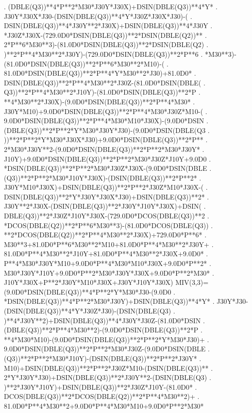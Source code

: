 \begin{framedverbatim}
     . (DBLE(Q3))**4*P**2*M30*J30Y*J30X)+DSIN(DBLE(Q3))**4*Y*
     . J30Y*J30X*J30-(DSIN(DBLE(Q3))**4*Y*J30Z*J30X*J30)-(
     . DSIN(DBLE(Q3))**4*J30Y**2*J30X)+DSIN(DBLE(Q3))**4*J30Y
     . *J30Z*J30X-(729.0D0*DSIN(DBLE(Q3))**2*DSIN(DBLE(Q2))**
     . 2*P**6*M30**3)-(81.0D0*DSIN(DBLE(Q3))**2*DSIN(DBLE(Q2)
     . )**2*P**4*M30**2*J30Y)-(729.0D0*DSIN(DBLE(Q3))**2*P**6
     . *M30**3)-(81.0D0*DSIN(DBLE(Q3))**2*P**6*M30**2*M10)-(
     . 81.0D0*DSIN(DBLE(Q3))**2*P**4*Y*M30**2*J30)+81.0D0*
     . DSIN(DBLE(Q3))**2*P**4*M30**2*J30Z-(81.0D0*DSIN(DBLE(
     . Q3))**2*P**4*M30**2*J10Y)-(81.0D0*DSIN(DBLE(Q3))**2*P
     . **4*M30**2*J30X)-(9.0D0*DSIN(DBLE(Q3))**2*P**4*M30*
     . J30Y*M10)+9.0D0*DSIN(DBLE(Q3))**2*P**4*M30*J30Z*M10-(
     . 9.0D0*DSIN(DBLE(Q3))**2*P**4*M30*M10*J30X)-(9.0D0*DSIN
     . (DBLE(Q3))**2*P**2*Y*M30*J30Y*J30)-(9.0D0*DSIN(DBLE(Q3
     . ))**2*P**2*Y*M30*J30X*J30)+9.0D0*DSIN(DBLE(Q3))**2*P**
     . 2*M30*J30Y**2-(9.0D0*DSIN(DBLE(Q3))**2*P**2*M30*J30Y*
     . J10Y)+9.0D0*DSIN(DBLE(Q3))**2*P**2*M30*J30Z*J10Y+9.0D0
     . *DSIN(DBLE(Q3))**2*P**2*M30*J30Z*J30X-(9.0D0*DSIN(DBLE
     . (Q3))**2*P**2*M30*J10Y*J30X)-(DSIN(DBLE(Q3))**2*P**2*
     . J30Y*M10*J30X)+DSIN(DBLE(Q3))**2*P**2*J30Z*M10*J30X-(
     . DSIN(DBLE(Q3))**2*Y*J30Y*J30X*J30)+DSIN(DBLE(Q3))**2*
     . J30Y**2*J30X-(DSIN(DBLE(Q3))**2*J30Y*J10Y*J30X)+DSIN(
     . DBLE(Q3))**2*J30Z*J10Y*J30X-(729.0D0*DCOS(DBLE(Q3))**2
     . *DCOS(DBLE(Q2))**2*P**6*M30**3)-(81.0D0*DCOS(DBLE(Q3))
     . **2*DCOS(DBLE(Q2))**2*P**4*M30**2*J30X)+729.0D0*P**6*
     . M30**3+81.0D0*P**6*M30**2*M10+81.0D0*P**4*M30**2*J30Y+
     . 81.0D0*P**4*M30**2*J10Y+81.0D0*P**4*M30**2*J30X+9.0D0*
     . P**4*M30*J30Y*M10+9.0D0*P**4*M30*M10*J30X+9.0D0*P**2*
     . M30*J30Y*J10Y+9.0D0*P**2*M30*J30Y*J30X+9.0D0*P**2*M30*
     . J10Y*J30X+P**2*J30Y*M10*J30X+J30Y*J10Y*J30X)
      MIV(3,3)=(9.0D0*DSIN(DBLE(Q3))**4*P**2*Y*M30*J30-(9.0D0
     . *DSIN(DBLE(Q3))**4*P**2*M30*J30Y)+DSIN(DBLE(Q3))**4*Y*
     . J30Y*J30-(DSIN(DBLE(Q3))**4*Y*J30Z*J30)-(DSIN(DBLE(Q3)
     . )**4*J30Y**2)+DSIN(DBLE(Q3))**4*J30Y*J30Z-(81.0D0*DSIN
     . (DBLE(Q3))**2*P**4*M30**2)-(9.0D0*DSIN(DBLE(Q3))**2*P
     . **4*M30*M10)-(9.0D0*DSIN(DBLE(Q3))**2*P**2*Y*M30*J30)+
     . 9.0D0*DSIN(DBLE(Q3))**2*P**2*M30*J30Z-(9.0D0*DSIN(DBLE
     . (Q3))**2*P**2*M30*J10Y)-(DSIN(DBLE(Q3))**2*P**2*J30Y*
     . M10)+DSIN(DBLE(Q3))**2*P**2*J30Z*M10-(DSIN(DBLE(Q3))**
     . 2*Y*J30Y*J30)+DSIN(DBLE(Q3))**2*J30Y**2-(DSIN(DBLE(Q3)
     . )**2*J30Y*J10Y)+DSIN(DBLE(Q3))**2*J30Z*J10Y-(81.0D0*
     . DCOS(DBLE(Q3))**2*DCOS(DBLE(Q2))**2*P**4*M30**2)+
     . 81.0D0*P**4*M30**2+9.0D0*P**4*M30*M10+9.0D0*P**2*M30*

\end{framedverbatim}
